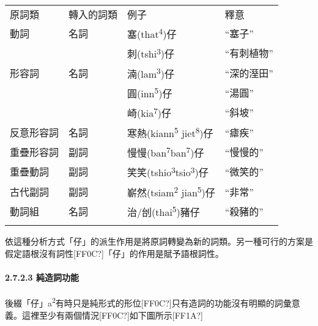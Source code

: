 \tabletail{}
\tablelasttail{}
\begin{tabularx}{\textwidth}{XXXX}
\lsptoprule

 原詞類 & 轉入的詞類 & 例子 & 釋意\\
動詞 & 名詞 & {\sffamily \textrm{塞(that}\textrm{\textsuperscript{4}}\textrm{)仔}} & “塞子”\\
\hhline{~~--} &  & {\sffamily \textrm{刺(tshi}\textrm{\textsuperscript{3}}\textrm{)仔}} & “有刺植物”\\
形容詞 & 名詞 & {\sffamily \textrm{湳(lam}\textrm{\textsuperscript{3}}\textrm{)仔}} & “深的溼田”\\
\hhline{~~--} &  & {\sffamily \textrm{圓(inn}\textrm{\textsuperscript{5}}\textrm{)仔}} & “湯圓”\\
\hhline{~~--} &  & {\sffamily \textrm{崎(kia}\textrm{\textsuperscript{7}}\textrm{)仔}} & “斜坡”\\
反意形容詞 & 名詞 & {\sffamily \textrm{寒熱(kiann}\textrm{\textsuperscript{5}} \textrm{jiet}\textrm{\textsuperscript{8}}\textrm{)仔}} & “瘧疾”\\
重疊形容詞 & 副詞 & {\sffamily \textrm{慢慢(ban}\textrm{\textsuperscript{7}}\textrm{ban}\textrm{\textsuperscript{7}}\textrm{)仔}} & “慢慢的”\\
重疊動詞 & 副詞 & {\sffamily \textrm{笑笑(tshio}\textrm{\textsuperscript{3}}\textrm{tsio}\textrm{\textsuperscript{3}}\textrm{)仔}} & “微笑的”\\
古代副詞 & 副詞 & {\sffamily \textrm{嶄然(tsiam}\textrm{\textsuperscript{2}} \textrm{jian}\textrm{\textsuperscript{5}}\textrm{)仔}} & “非常”\\
動詞組 & 名詞 & {\sffamily \textrm{治/刣(thai}\textrm{\textsuperscript{5}}\textrm{)豬仔}} & “殺豬的”\\
\lspbottomrule
\end{tabularx}
\textrm{依這種分析方式「仔」的派生作用是將原詞轉變為新的詞類。另一種可行的方案是假定語根沒有詞性[FF0C?]「仔」的作用是賦予語根詞性。}

\paragraph{2.7.2.3 純造詞功能}

\textrm{後綴「仔」a}\textrm{\textsuperscript{2}}\textrm{有時只是純形式的形位[FF0C?]只有造詞的功能沒有明顯的詞彙意義。這裡至少有兩個情況[FF0C?]如下圖所示[FF1A?]}

\tablefirsthead{}

